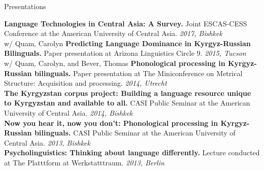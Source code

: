 \documentclass{resume} %
\begin{document}
\vspace{.25cm}

\begin{rSection}{Presentations}
  
  {\bf Language Technologies in Central Asia: A Survey.} {Joint ESCAS-CESS Conference at the American University of Central Asia.} \hfill {\em 2017, Bishkek} \\
  
{w/ Quam, Carolyn} {\bf Predicting Language Dominance in Kyrgyz-Russian Bilinguals.} {Paper presentation at Arizona Linguistics Circle 9.} \hfill {\em 2015, Tucson} \\

{w/ Quam, Carolyn, and Bever, Thomas} {\bf Phonological processing in Kyrgyz-Russian bilinguals.} {Paper presentation at The Miniconference on Metrical Structure: Acquisition and processing.} \hfill {\em 2014, Utrecht} \\

{\bf The Kyrgyzstan corpus project: Building a language resource unique to Kyrgyzstan and available to all.} {CASI Public Seminar at the American University of Central Asia.} \hfill {\em 2014, Bishkek} \\

{\bf Now you hear it, now you don’t: Phonological processing in Kyrgyz-Russian bilinguals.} {CASI Public Seminar at the American University of Central Asia.} \hfill {\em 2013, Bishkek} \\

{\bf Psycholinguistics: Thinking about language differently.} {Lecture conducted at The Platttform at Werkstatttraum.} \hfill {\em 2013, Berlin} \\


\end{rSection}




\end{document}
